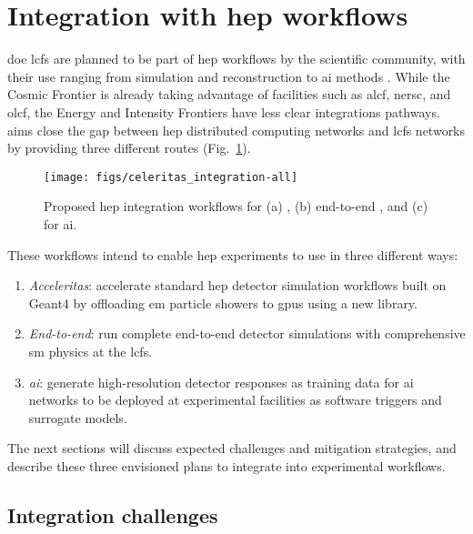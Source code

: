 \section{Integration with \ac{hep} workflows}

\ac{doe} \acp{lcf} are planned to be part of \ac{hep} workflows by the
scientific community, with their use ranging from simulation and reconstruction
to \ac{ai} methods \cite{hep-network-requirements}. While the Cosmic Frontier is
already taking advantage of facilities such as \ac{alcf}, \ac{nersc}, and
\ac{olcf}, the Energy and Intensity Frontiers have less clear integrations
pathways. \celeritas aims close the gap between \ac{hep} distributed computing
networks and \acp{lcf} networks by providing three different routes
(Fig.~\ref{fig:celeritas-hep-workflows}).
\begin{figure}
    \centering
    \texttt{[image: figs/celeritas\_integration-all]}
    \caption{Proposed \acs{hep} integration workflows for (a) \acceleritas, (b)
    end-to-end \celeritas, and (c) \celeritas for \acs{ai}.}
    \label{fig:celeritas-hep-workflows}
\end{figure}
These workflows intend to enable \ac{hep} experiments to use \celeritas
in three different ways:
\begin{enumerate}[itemsep=0pt, label=(\alph*)]
  \item \emph{Acceleritas}: accelerate standard \ac{hep} detector simulation
    workflows built on Geant4 by offloading \ac{em} particle showers to
    \acp{gpu} using a new \acceleritas library.
  \item \emph{End-to-end}: run complete end-to-end detector simulations with
    comprehensive \ac{sm} physics at the \acp{lcf}.
  \item \emph{\ac{ai}}: generate high-resolution detector responses as training
    data for \ac{ai} networks to be deployed at experimental facilities as
    software triggers and surrogate models.
\end{enumerate}
The next sections will discuss expected challenges and mitigation strategies,
and describe these three envisioned plans to integrate \celeritas into
experimental workflows.

\subsection{Integration challenges}

